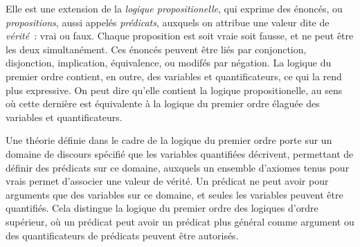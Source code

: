 Elle est une extension de la \textit{logique propositionelle}, qui exprime des énoncés, ou \textit{propositions}, aussi appelés \textit{prédicats}, auxquels on attribue une valeur dite de \textit{vérité} : vrai ou faux.
Chaque proposition est soit vraie soit fausse, et ne peut être les deux simultanément. 
Ces énoncés peuvent être liés par conjonction, disjonction, implication, équivalence, ou modifés par négation. 
La logique du premier ordre contient, en outre, des variables et quantificateurs, ce qui la rend plus expressive. 
On peut dire qu'elle contient la logique propositionelle, au sens où cette dernière est équivalente à la logique du premier ordre élaguée des variables et quantificateurs.

Une théorie définie dans le cadre de la logique du premier ordre porte sur un domaine de discours spécifié que les variables quantifiées décrivent, permettant de définir des prédicats sur ce domaine, auxquels un ensemble d'axiomes tenus pour vrais permet d'associer une valeur de vérité. 
Un prédicat ne peut avoir pour arguments que des variables sur ce domaine, et seules les variables peuvent être quantifiés. 
Cela distingue la logique du premier ordre des logiques d'ordre supérieur, où un prédicat peut avoir un prédicat plus général comme argument ou des quantificateurs de prédicats peuvent être autorisés.


